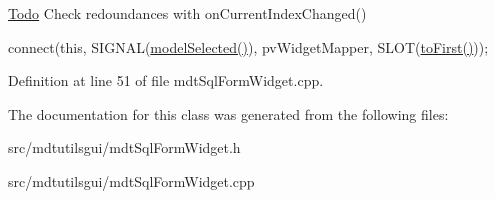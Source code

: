 \begin{Desc}
\item[\hyperlink{todo__todo000069}{Todo}]Check redoundances with onCurrentIndexChanged() \end{Desc}


connect(this, SIGNAL(\hyperlink{classmdt_abstract_sql_widget_a6787c093d9b0b64a1e8d3794ba505604}{modelSelected()}), pvWidgetMapper, SLOT(\hyperlink{classmdt_sql_form_widget_a4bb7ddf419e845de2d1a7c1ef95e48a8}{toFirst()})); 



Definition at line 51 of file mdtSqlFormWidget.cpp.



The documentation for this class was generated from the following files:\begin{DoxyCompactItemize}
\item 
src/mdtutilsgui/mdtSqlFormWidget.h\item 
src/mdtutilsgui/mdtSqlFormWidget.cpp\end{DoxyCompactItemize}
